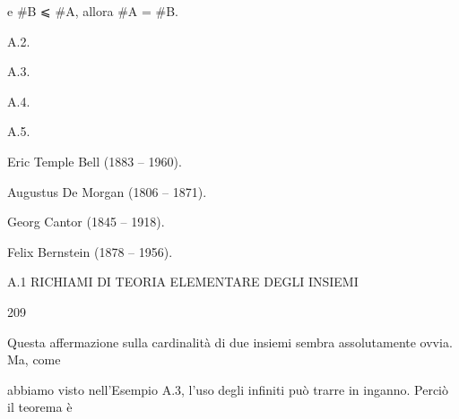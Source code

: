 \documentclass[a4paper,portrait,12pt]{article}
\begin{document}
\begin{flushleft}
e \#B ⩽ \#A, allora \#A = \#B.
\end{flushleft}


\begin{flushleft}
A.2.
\end{flushleft}


\begin{flushleft}
A.3.
\end{flushleft}


\begin{flushleft}
A.4.
\end{flushleft}


\begin{flushleft}
A.5.
\end{flushleft}





\begin{flushleft}
Eric Temple Bell (1883 -- 1960).
\end{flushleft}


\begin{flushleft}
Augustus De Morgan (1806 -- 1871).
\end{flushleft}


\begin{flushleft}
Georg Cantor (1845 -- 1918).
\end{flushleft}


\begin{flushleft}
Felix Bernstein (1878 -- 1956).
\end{flushleft}





\begin{flushleft}
\newpage
A.1 RICHIAMI DI TEORIA ELEMENTARE DEGLI INSIEMI
\end{flushleft}





209





\begin{flushleft}
Questa affermazione sulla cardinalit\`{a} di due insiemi sembra assolutamente ovvia. Ma, come
\end{flushleft}


\begin{flushleft}
abbiamo visto nell'Esempio A.3, l'uso degli infiniti pu\`{o} trarre in inganno. Perci\`{o} il teorema \`{e}
\end{flushleft}
\end{document}
